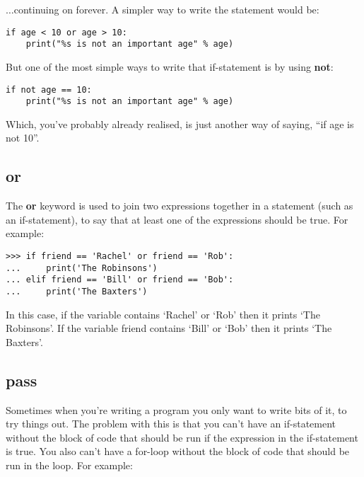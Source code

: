 \noindent
$\ldots$continuing on forever. A simpler way to write the statement would be:

\begin{Verbatim}[frame=single]
if age < 10 or age > 10:
    print("%s is not an important age" % age)
\end{Verbatim}

\noindent
But one of the most simple ways to write that if-statement is by using \textbf{not}:

\begin{Verbatim}[frame=single]
if not age == 10:
    print("%s is not an important age" % age)
\end{Verbatim}

\noindent
Which, you've probably already realised, is just another way of saying, ``if age is not 10''.

\subsection*{or}

The \textbf{or} keyword is used to join two expressions together in a statement (such as an if-statement), to say that at least one of the expressions should be true.  For example:

\begin{Verbatim}[frame=single]
>>> if friend == 'Rachel' or friend == 'Rob':
...     print('The Robinsons')
... elif friend == 'Bill' or friend == 'Bob':
...     print('The Baxters')
\end{Verbatim}

In this case, if the variable  contains `Rachel' or `Rob' then it prints `The Robinsons'.  If the variable friend contains `Bill' or `Bob' then it prints `The Baxters'.

\subsection*{pass}

Sometimes when you're writing a program you only want to write bits of it, to try things out.  The problem with this is that you can't have an if-statement without the block of code that should be run if the expression in the if-statement is true. You also can't have a for-loop without the block of code that should be run in the loop. For example:

